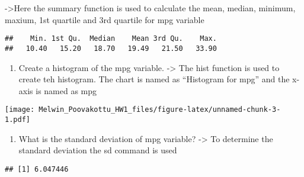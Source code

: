 \documentclass[]{article}
\newenvironment{Shaded}{\begin{snugshade}}{\end{snugshade}}
\newcommand{\KeywordTok}[1]{\textcolor[rgb]{0.13,0.29,0.53}{\textbf{{#1}}}}
\newcommand{\DataTypeTok}[1]{\textcolor[rgb]{0.13,0.29,0.53}{{#1}}}
\newcommand{\StringTok}[1]{\textcolor[rgb]{0.31,0.60,0.02}{{#1}}}
\newcommand{\NormalTok}[1]{{#1}}
\begin{document}
-\textgreater{}Here the summary function is used to calculate the mean,
median, minimum, maxium, 1st quartile and 3rd quartile for mpg variable

\begin{Shaded}
\end{Shaded}

\begin{verbatim}
##    Min. 1st Qu.  Median    Mean 3rd Qu.    Max. 
##   10.40   15.20   18.70   19.49   21.50   33.90
\end{verbatim}

\begin{enumerate}
\def\labelenumi{\arabic{enumi}.}
\setcounter{enumi}{2}
\itemsep1pt\parskip0pt
\item
  Create a histogram of the mpg variable. -\textgreater{} The hist
  function is used to create teh histogram. The chart is named as
  ``Histogram for mpg'' and the x-axis is named as mpg
\end{enumerate}

\begin{Shaded}
\end{Shaded}

\texttt{[image: Melwin\_Poovakottu\_HW1\_files/figure-latex/unnamed-chunk-3-1.pdf]}

\begin{enumerate}
\def\labelenumi{\arabic{enumi}.}
\setcounter{enumi}{3}
\itemsep1pt\parskip0pt
\item
  What is the standard deviation of mpg variable? -\textgreater{} To
  determine the standard deviation the sd command is used
\end{enumerate}

\begin{Shaded}
\end{Shaded}

\begin{verbatim}
## [1] 6.047446
\end{verbatim}
\end{document}
